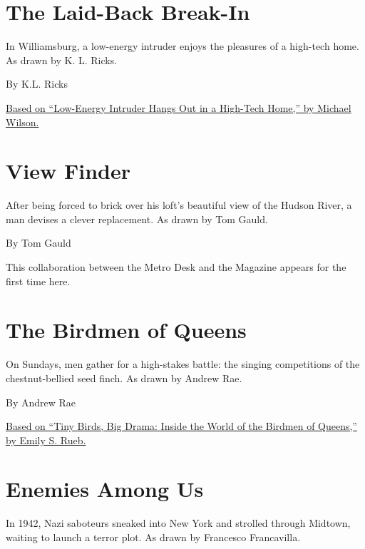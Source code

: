 \hypertarget{the-laid-back-break-in}{%
\section{The Laid-Back Break-In}\label{the-laid-back-break-in}}

In Williamsburg, a low-energy intruder enjoys the pleasures of a
high-tech home. As drawn by K. L. Ricks.

By K.L. Ricks

\href{https://www.nytimes3xbfgragh.onion/2017/03/05/nyregion/intruder-brooklyn-apartment.html}{Based
on ``Low-Energy Intruder Hangs Out in a High-Tech Home,'' by Michael
Wilson.}

\hypertarget{view-finder}{%
\section{View Finder}\label{view-finder}}

After being forced to brick over his loft's beautiful view of the Hudson
River, a man devises a clever replacement. As drawn by Tom Gauld.

By Tom Gauld

This collaboration between the Metro Desk and the Magazine appears for
the first time here.

\hypertarget{the-birdmen-of-queens}{%
\section{The Birdmen of Queens}\label{the-birdmen-of-queens}}

On Sundays, men gather for a high-stakes battle: the singing
competitions of the chestnut-bellied seed finch. As drawn by Andrew Rae.

By Andrew Rae

\href{https://www.nytimes3xbfgragh.onion/2015/08/02/nyregion/tiny-birds-big-drama-inside-the-world-of-the-birdmen-of-queens.html}{Based
on ``Tiny Birds, Big Drama: Inside the World of the Birdmen of Queens,''
by Emily S. Rueb.}

\hypertarget{enemies-among-us}{%
\section{Enemies Among Us}\label{enemies-among-us}}

In 1942, Nazi saboteurs sneaked into New York and strolled through
Midtown, waiting to launch a terror plot. As drawn by Francesco
Francavilla.

